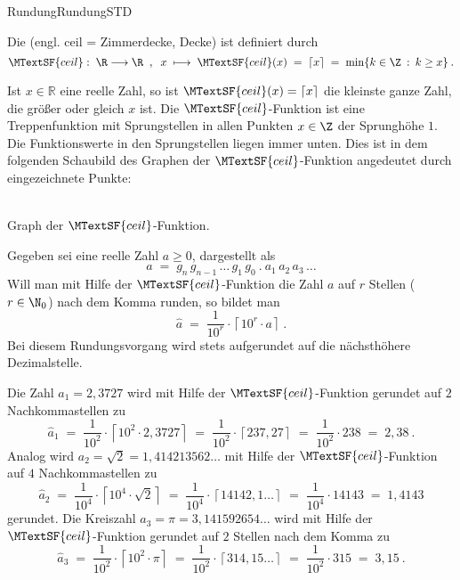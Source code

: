 \begin{MXContent}{Rundung}{Rundung}{STD}
\begin{MInfo}
Die  (engl. ceil = Zimmerdecke, Decke) ist definiert durch
$$
\MTextSF{ceil}:\; \R\longrightarrow\R\;\; , \;\;
x\;\longmapsto\; \MTextSF{ceil}(x)\;=\; \left\lceil{ x}\right\rceil\;=\; \min\lbrace k\in\Z\: :\: k\geq x\rbrace\: .
$$
\end{MInfo}

Ist $x\in \mathbb{R}$ eine reelle Zahl, so ist
$\MTextSF{ceil}(x)=\left\lceil{ x }\right\rceil$ die kleinste ganze Zahl, die größer oder gleich $x$ ist.
Die $\MTextSF{ceil}$-Funktion ist eine Treppenfunktion mit Sprungstellen in allen Punkten $x\in\Z$ der Sprunghöhe $1$.
Die Funktionswerte in den Sprungstellen liegen immer unten. Dies ist in dem folgenden Schaubild des Graphen der $\MTextSF{ceil}$-Funktion angedeutet durch eingezeichnete Punkte:

\begin{center}
\\
Graph der $\MTextSF{ceil}$-Funktion.
\end{center}

Gegeben sei eine reelle Zahl $a\geq 0$, dargestellt als 
$$
a \;=\; g_n\, g_{n-1}\, \ldots\, g_1\, g_0\: .\: a_1\,a_2\, a_3\, \ldots
$$
Will man mit Hilfe der $\MTextSF{ceil}$-Funktion die Zahl $a$ auf $r$ Stellen ($r\in\N_0$) nach dem Komma runden, so bildet man
$$
\hat{a} \;=\; \frac{1}{10^{r}}\cdot \left\lceil{ 10^{r}\cdot a }\right\rceil \: .
$$
Bei diesem Rundungsvorgang wird stets aufgerundet auf die nächsthöhere Dezimalstelle.

\begin{MExample}
Die Zahl $a_1=2,3727$ wird mit Hilfe der $\MTextSF{ceil}$-Funktion gerundet auf $2$ Nachkommastellen zu
$$
\hat{a}_{1}\;=\; \frac{1}{10^{2}}\cdot \left\lceil{ 10^{2}\cdot 2,3727}\right\rceil\; =\; \frac{1}{10^{2}}\cdot \left\lceil{ 237,27}\right\rceil \;=\; \frac{1}{10^{2}}\cdot 238 \;=\; 2,38\: .
$$
Analog wird $a_{2}=\sqrt{2}=1,414213562\ldots$ mit Hilfe der $\MTextSF{ceil}$-Funktion auf $4$ Nachkommastellen zu
$$
\hat{a}_{2}\; =\; \frac{1}{10^{4}}\cdot \left\lceil{ 10^{4}\cdot \sqrt{2}}\right\rceil\; =\; \frac{1}{10^{4}}\cdot \left\lceil{ 14142,1\ldots}\right\rceil \;=\; \frac{1}{10^{4}}\cdot 14143\; =\; 1,4143
$$
gerundet. Die Kreiszahl $a_{3}=\pi=3,141592654\ldots$ wird mit Hilfe der $\MTextSF{ceil}$-Funktion gerundet auf $2$ Stellen nach dem Komma zu
$$
\hat{a}_{3}\; =\; \frac{1}{10^{2}}\cdot \left\lceil{ 10^{2}\cdot \pi }\right\rceil\; =\; \frac{1}{10^{2}}\cdot \left\lceil{ 314,15\ldots }\right\rceil\; =\;\frac{1}{10^{2}}\cdot 315 \;=\; 3,15\: .
$$
\end{MExample}


\end{MXContent}
